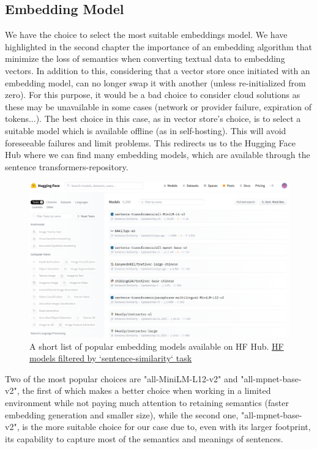 \subsection{Embedding Model}
We have the choice to select the most suitable embeddings model.\newline
We have highlighted in the second chapter the importance of an embedding algorithm that minimize the loss of semantics when converting textual data to embedding vectors. In addition to this, considering that a vector store once initiated with an embedding model, can no longer swap it with another (unless re-initialized from zero). For this purpose, it would be a bad choice to consider cloud solutions as these may be unavailable in some cases (network or provider failure, expiration of tokens...).\newline
The best choice in this case, as in vector store's choice, is to select a suitable model which is available offline (as in self-hosting). This will avoid foreseeable failures and limit problems.\newline
This redirects us to the Hugging Face Hub where we can find many embedding models, which are available through the sentence transformers-repository.
\begin{figure}[htbp]
    \centering
    \includegraphics[width=.85\linewidth]{./figures/hf-embedding-models.png}
    \caption{A short list of popular embedding models available on HF Hub. \href{https://huggingface.co/models?pipeline_tag=sentence-similarity&sort=likes}{HF models filtered by `sentence-similarity` task}}
\end{figure}\newline
Two of the most popular choices are "all-MiniLM-L12-v2" and "all-mpnet-base-v2", the first of which makes a better choice when working in a limited environment while not paying much attention to retaining semantics (faster embedding generation and smaller size), while the second one, "all-mpnet-base-v2", is the more suitable choice for our case due to, even with its larger footprint, its capability to capture most of the semantics and meanings of sentences.\newpage
